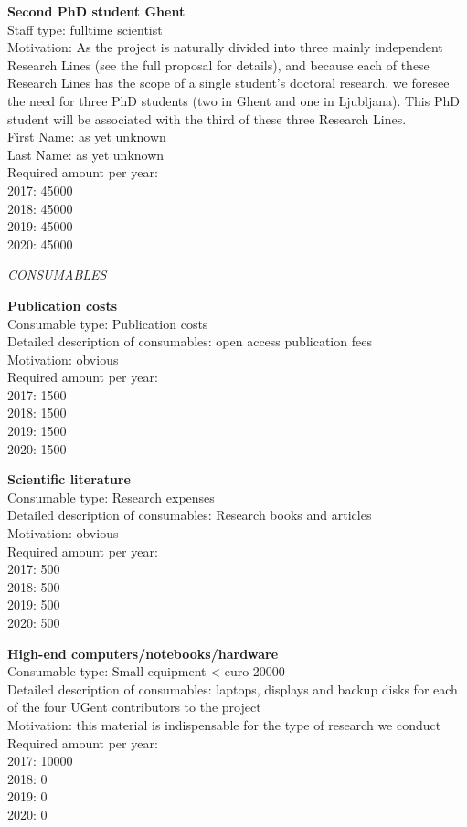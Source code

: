 \documentclass[11pt,dvipsnames,usenames,a4paper]{article}
\begin{document}
{\bf Second PhD student Ghent}\\
Staff type: fulltime scientist\\
Motivation: As the project is naturally divided into three mainly independent Research Lines (see the full proposal for details), and because each of these Research Lines has the scope of a single student's doctoral research, we foresee the need for three PhD students (two in Ghent and one in Ljubljana). This PhD student will be associated with the third of these three Research Lines.\\
First Name: as yet unknown\\
Last Name: as yet unknown\\
Required amount per year:\\
2017: 45000\\
2018: 45000\\
2019: 45000\\
2020: 45000

{\it CONSUMABLES}

{\bf Publication costs}\\
Consumable type: Publication costs\\
Detailed description of consumables: open access publication fees\\
Motivation: obvious\\
Required amount per year:\\
2017: 1500\\
2018: 1500\\
2019: 1500\\
2020: 1500

{\bf Scientific literature}\\
Consumable type: Research expenses\\
Detailed description of consumables: Research books and articles\\
Motivation: obvious\\
Required amount per year:\\
2017: 500\\
2018: 500\\
2019: 500\\
2020: 500


{\bf High-end computers/notebooks/hardware}\\
Consumable type: Small equipment < euro 20000\\
Detailed description of consumables: laptops, displays and backup disks for each of the four UGent contributors to the project\\
Motivation: this material is indispensable for the type of research we conduct\\
Required amount per year:\\
2017: 10000\\
2018: 0\\
2019: 0\\
2020: 0
\end{document}

